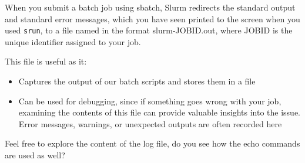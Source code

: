 \documentclass[
  letterpaper,
  DIV=11,
  numbers=noendperiod]{scrreprt}
\providecommand{\tightlist}{%
  \setlength{\itemsep}{0pt}\setlength{\parskip}{0pt}}\usepackage{longtable,booktabs,array}
\begin{document}
When you submit a batch job using sbatch, Slurm redirects the standard
output and standard error messages, which you have seen printed to the
screen when you used \texttt{srun}, to a file named in the format
slurm-JOBID.out, where JOBID is the unique identifier assigned to your
job.

This file is useful as it:

\begin{itemize}
\tightlist
\item
  Captures the output of our batch scripts and stores them in a file
\item
  Can be used for debugging, since if something goes wrong with your
  job, examining the contents of this file can provide valuable insights
  into the issue. Error messages, warnings, or unexpected outputs are
  often recorded here
\end{itemize}

Feel free to explore the content of the log file, do you see how the
echo commands are used as well?
\end{document}
